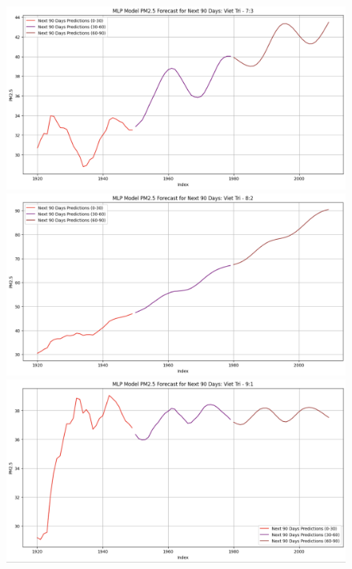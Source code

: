 \begin{figure}[H]
        \begin{minipage}{0.15\textwidth}
            \centering
            \includegraphics[width=1\textwidth]{img/final/MLP/90D/MLP_7_3_VT_90D.png}
            \end{minipage}
            \hfill
            \begin{minipage}{0.15\textwidth}
            \centering
            \includegraphics[width=1\textwidth]{img/final/MLP/90D/MLP_8_2_VT_90D.png}
            \end{minipage}
            \hfill
            \begin{minipage}{0.15\textwidth}
            \centering
            \includegraphics[width=1\textwidth]{img/final/MLP/90D/MLP_9_1_VT_90D.png}
            \end{minipage}
            \hfill
    

\end{figure}
